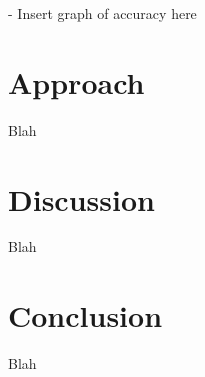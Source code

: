\documentclass[11pt, notitlepage]{article}
\begin{document}
\begin{multicols}{2}
- Insert graph of accuracy here 


\section{Approach}
Blah


\section{Discussion}
Blah


\section{Conclusion}
Blah






\end{multicols}
\end{document}
